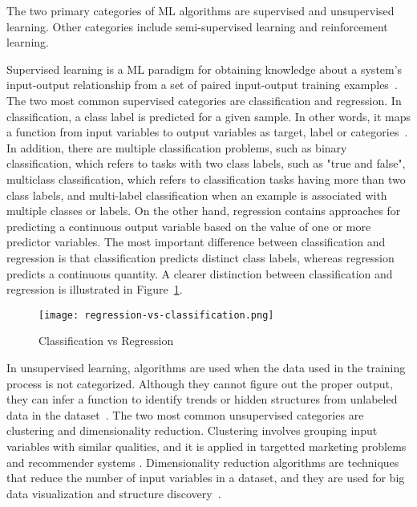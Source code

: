 \begin{enumerate}
    The two primary categories of \gls{ML} algorithms are supervised and unsupervised learning. Other categories include semi-supervised learning and reinforcement learning.
    
    Supervised learning is a \gls{ML} paradigm for obtaining knowledge about a system's input-output relationship from a set of paired input-output training examples~\cite{Liu2012SupervisedLearning}. The two most common supervised categories are classification and regression. In classification, a class label is predicted for a given sample. In other words, it maps a function from input variables to output variables as target, label or categories~\cite{Sarker2021MachineDirections}.
    In addition, there are multiple classification problems, such as binary classification, which refers to tasks with two class labels, such as "true and false", multiclass classification, which refers to classification tasks having more than two class labels, and multi-label classification when an example is associated with multiple classes or labels. On the other hand, regression contains approaches for predicting a continuous output variable based on the value of one or more predictor variables. The most important difference between classification and regression is that classification predicts distinct class labels, whereas regression predicts a continuous quantity. A clearer distinction between classification and regression is illustrated in Figure~\ref{fig:regression_vs_classification}.
        
    \begin{figure}[htbp]
        \centering
        \texttt{[image: regression-vs-classification.png]}
        \caption{Classification vs Regression~\cite{Matanga2017AnalysisInterfaces}}
        \label{fig:regression_vs_classification}
    \end{figure}
    
    In unsupervised learning, algorithms are used when the data used in the training process is not categorized. Although they cannot figure out the proper output, they can infer a function to identify trends or hidden structures from unlabeled data in the dataset~\cite{Karazi2019StatisticalProcess-Review}. The two most common unsupervised categories are clustering and dimensionality reduction. Clustering involves grouping input variables with similar qualities, and it is applied in targetted marketing problems and recommender systems \cite{Omran2007AnMethods}. Dimensionality reduction algorithms are techniques that reduce the number of input variables in a dataset, and they are used for big data visualization and structure discovery~\cite{VanDerMaaten2009DimensionalityComparative}. 
    

\end{enumerate}

